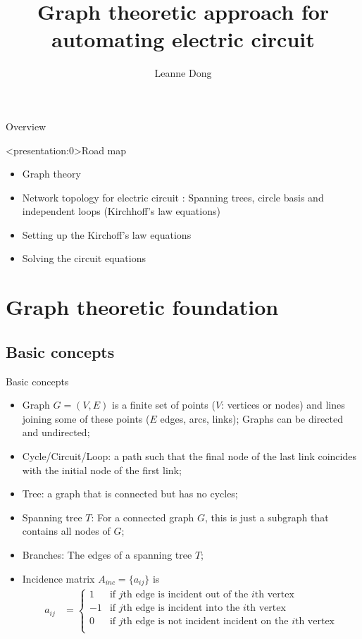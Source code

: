 \documentclass[xcolor=dvipsnames]{beamer}
\title{Graph theoretic approach for automating electric circuit}
\author{Leanne Dong}
\begin{document}
\begin{frame}
\titlepage
\end{frame}
\begin{frame}{Overview}
\tableofcontents
\end{frame}


\begin{frame}<presentation:0>{Road map}
	\begin{itemize}
		\item {\color{purple}Graph theory} 
		\item {\color{purple}Network topology for electric circuit} : Spanning trees, circle basis and independent loops (Kirchhoff's law equations)
		\item {\color{purple}Setting up the Kirchoff's law equations} 
		\item {\color{purple}Solving the circuit equations}
	\end{itemize}
\end{frame}

\section{Graph theoretic foundation}

\subsection{Basic concepts}
\begin{frame}{Basic concepts}
\begin{itemize}
	\item {\color{red}Graph} $G=(V, E)$ is a finite set of points ($V$: vertices or nodes) and lines joining some of these points ($E$ edges, arcs, links); Graphs can be directed and {\color{red}undirected};
	\item Cycle/Circuit/Loop: a path such that the final node of the last link coincides with the initial node of the first link;
	\item Tree: a graph that is connected but has no cycles;
	\item Spanning tree $T$: For a connected graph $G$, this is just a subgraph that contains all nodes of $G$;
	\item Branches: The edges of a spanning tree $T$;
	\item Incidence matrix $A_{inc}=\{a_{ij}\}$ is
	\begin{align*}
		a_{ij} &= 
		\begin{cases}
			1 & \mbox{if $j$th edge is incident out of the $i$th vertex}\\
			-1& \mbox{if $j$th edge is incident into  the $i$th vertex}\\
			0& \mbox{if $j$th edge is not incident incident on the $i$th vertex}\\
		\end{cases}
	\end{align*}
\end{itemize}
\end{frame}
\end{document}
